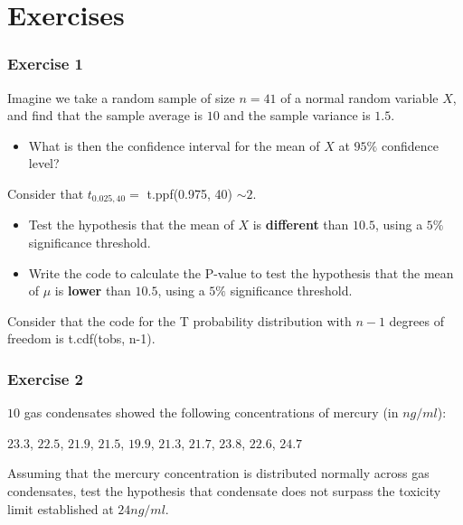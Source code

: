 \documentclass[
]{book}
\providecommand{\tightlist}{%
  \setlength{\itemsep}{0pt}\setlength{\parskip}{0pt}}
\begin{document}
\hypertarget{exercises-12}{%
\section{Exercises}\label{exercises-12}}

\hypertarget{exercise-1-11}{%
\subsubsection{Exercise 1}\label{exercise-1-11}}

Imagine we take a random sample of size \(n = 41\) of a normal random variable \(X\), and find that the sample average is \(10\) and the sample variance is \(1.5\).

\begin{itemize}
\tightlist
\item
  What is then the confidence interval for the mean of \(X\) at \(95\%\) confidence level?
\end{itemize}

Consider that \(t_{0.025,40}=\) t.ppf(0.975, 40) \(\sim 2\).

\begin{itemize}
\item
  Test the hypothesis that the mean of \(X\) is \textbf{different} than \(10.5\), using a \(5\%\) significance threshold.
\item
  Write the code to calculate the P-value to test the hypothesis that the mean of \(\mu\) is \textbf{lower} than \(10.5\), using a \(5\%\) significance threshold.
\end{itemize}

Consider that the code for the T probability distribution with \(n-1\) degrees of freedom is t.cdf(tobs, n-1).

\hypertarget{exercise-2-11}{%
\subsubsection{Exercise 2}\label{exercise-2-11}}

\(10\) gas condensates showed the following concentrations of mercury (in \(ng/ml\)):

\(23.3\), \(22.5\), \(21.9\), \(21.5\), \(19.9\), \(21.3\), \(21.7\), \(23.8\), \(22.6\), \(24.7\)

Assuming that the mercury concentration is distributed normally across gas condensates, test the hypothesis that condensate does not surpass the toxicity limit established at \(24 ng/ml\).
\end{document}

